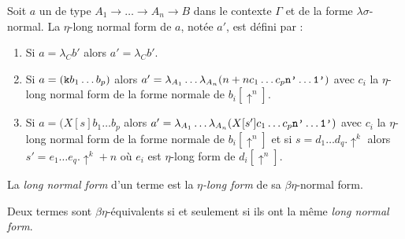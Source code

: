 \begin{defn}
Soit $a$ un \lsterm{} de type $A_1 \xrightarrow{} \dots \xrightarrow{} A_n \xrightarrow{} B$ dans le contexte $\Gamma$ et de la forme $\lambda\sigma$-normal. La $\eta$-long normal form de $a$, notée $a'$, est défini par :
\begin{enumerate}
    \item Si $a = \lambda_Cb'$ alors $a' = \lambda_Cb'$.
    \item Si $a = (\verb?k?b_1\dots b_p)$ alors $a' = \lambda_{A_1} \dots \lambda_{A_n}(n+n c_1\dots c_p \verb?n'?\dots \verb?1'?)$ avec $c_i$ la $\eta$-long normal form de la forme normale de $b_i[\uparrow^n]$.
    \item Si $a = (X[s]b_1\dots b_p$ alors $a' = \lambda_{A_1}\dots \lambda_{A_n}(X[s']c_1\dots c_p\verb?n'?\dots \verb?1'?)$ avec $c_i$ la $\eta$-long normal form de la forme normale de $b_i[\uparrow^n]$ et si $s = d_1\dots d_q.\uparrow^k$ alors $s' = e_1\dots e_q.\uparrow^k+n$ où $e_i$ est $\eta$-long form de $d_i[\uparrow^n]$.
\end{enumerate}

\begin{defn}
La \textit{long normal form} d'un terme est la \textit{$\eta$-long form} de sa $\beta\eta$-normal form.
\end{defn}

\begin{prop}
Deux termes sont $\beta\eta$-équivalents si et seulement si ils ont la même \textit{long normal form}. 
\end{prop}
\end{defn}
